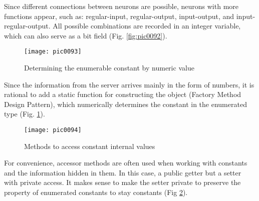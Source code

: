 Since different connections between neurons are possible, neurons with more functions appear, such as: regular-input, regular-output, input-output, and input-regular-output. All possible combinations are recorded in an integer variable, which can also serve as a bit field (Fig. \ref{fig:pic0092}).

\begin{figure}[h]
\centering
\texttt{[image: pic0093]}
\caption{Determining the enumerable constant by numeric value}
\label{fig:pic0093}
\end{figure}
\FloatBarrier

Since the information from the server arrives mainly in the form of numbers, it is rational to add a static function for constructing the object (Factory Method Design Pattern), which numerically determines the constant in the enumerated type (Fig. \ref{fig:pic0093}).

\begin{figure}[h]
\centering
\texttt{[image: pic0094]}
\caption{Methods to access constant internal values}
\label{fig:pic0094}
\end{figure}
\FloatBarrier

For convenience, accessor methods are often used when working with constants and the information hidden in them. In this case, a public getter but a setter with private access. It makes sense to make the setter private to preserve the property of enumerated constants to stay constants (Fig \ref{fig:pic0094}).
